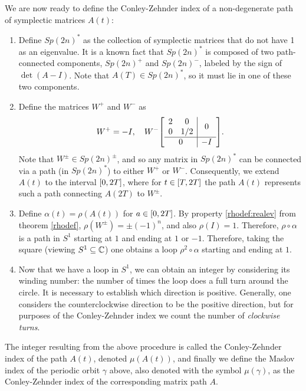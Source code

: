 We are now ready to define the Conley-Zehnder index of a non-degenerate path of symplectic matrices $A(t)$:

\begin{enumerate}[algorithm]
\item Define $Sp(2n)^*$ as the collection of symplectic matrices that do not have 1 as an eigenvalue. It is a known fact \cite[proposition~7.1.4]{audin} that $Sp(2n)^*$ is composed of two path-connected components, $Sp(2n)^+$ and $Sp(2n)^-$, labeled by the sign of $\det(A-I)$. Note that $A(T) \in Sp(2n)^*$, so it must lie in one of these two components.
\item\label{maslov:step2} Define the matrices $W^+$ and $W^-$ as
\begin{equation}
W^+ = - I, \quad W^- \mleft[\begin{array}{c|c}
\begin{matrix} 2 & 0 \\ 0 & 1/2 \end{matrix} & 0\\
\hline
0 & -I
\end{array}\mright].
\end{equation}
Note that $W^\pm \in Sp(2n)^\pm$, and so any matrix in $Sp(2n)^*$ can be connected via a path (in $Sp(2n)^*$) to either $W^+$ or $W^-$. Consequently, we extend $A(t)$ to the interval $\interval 0 {2T}$, where for $t \in \interval T {2T}$ the path $A(t)$ represents such a path connecting $A(2T)$ to $W^\pm$.
\item Define $\alpha(t) = \rho(A(t))$ for $a \in \interval 0 {2T}$. By property \ref{rhodef:realev} from theorem \ref{rhodef}, $\rho(W^\pm) = \pm(-1)^n$, and also $\rho(I) = 1$. Therefore, $\rho \circ \alpha$ is a path in $S^1$ starting at $1$ and ending at $1$ or $-1$. Therefore, taking the square (viewing $S^1 \subseteq \mathbb{C}$) one obtains a loop $\rho^2 \circ \alpha$ starting and ending at $1$.
\item Now that we have a loop in $S^1$, we can obtain an integer by considering its winding number: the number of times the loop does a full turn around the circle. It is necessary to establish which direction is positive. Generally, one considers the counterclockwise direction to be the positive direction, but for purposes of the Conley-Zehnder index we count the number of \emph{clockwise turns}.
\end{enumerate}
The integer resulting from the above procedure is called the Conley-Zehnder index of the path $A(t)$, denoted $\mu(A(t))$, and finally we define the Maslov index of the periodic orbit $\gamma$ above, also denoted with the symbol $\mu(\gamma)$, as the Conley-Zehnder index of the corresponding matrix path $A$.

